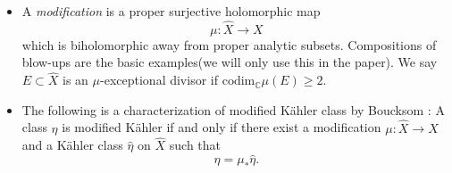 \documentclass[reqno]{amsart}
\theoremstyle{remark}
\def\C{\mathbb{C}}
\newcommand{\MN}{\operatorname{MN}}
\newcommand{\MK}{\operatorname{MK}}
\theoremstyle{plain}
\begin{document}
\begin{itemize}
There is also a direct one-line implication that will be used repeatedly.
If $\gamma\in\MN(X)$ and $\delta>0$, choose from the definition a current
\[
 T_{\delta/2}\in\gamma,\qquad
 T_{\delta/2}\geq-\frac{\delta}{2}h,\qquad
 \nu(T_{\delta/2},D)=0\quad\forall \text{ divisor }D.
\]
Then $
 T_{\delta/2}+\delta h\geq\frac{\delta}{2}h$
is a K\"ahler current in $\gamma+\delta h$, with the same generic
divisorial Lelong numbers.  Therefore, directly from the definitions,
\begin{equation}\label{eq:add-kahler}
 \gamma+\delta h\in\MK(X).
\end{equation}
Applying Demailly's regularization to $T_{\delta/2}+\delta h$ additionally
gives K\"ahler currents smooth away from subvarieties of codimension at least two.
\item A \emph{modification} is a proper surjective holomorphic map
\[
 \mu:\widehat X\longrightarrow X
\]
which is biholomorphic away from proper analytic subsets. 
Compositions of blow-ups are the basic examples(we will only use this in the paper). We say $E\subset \widehat X$ is an $\mu$-exceptional divisor if $\text{codim}_\C \mu(E)\geq 2.$
\item The following is a characterization of modified K\"ahler class by Boucksom \cite[proposition 2.3]{B04}:
A class $\eta$ is modified K\"ahler if and only if there exist a
modification $\mu:\widehat X\to X$ and a K\"ahler class
$\widehat\eta$ on $\widehat X$ such that
\[
 \eta=\mu_*\widehat\eta.
\]


\end{itemize}
\end{document}
